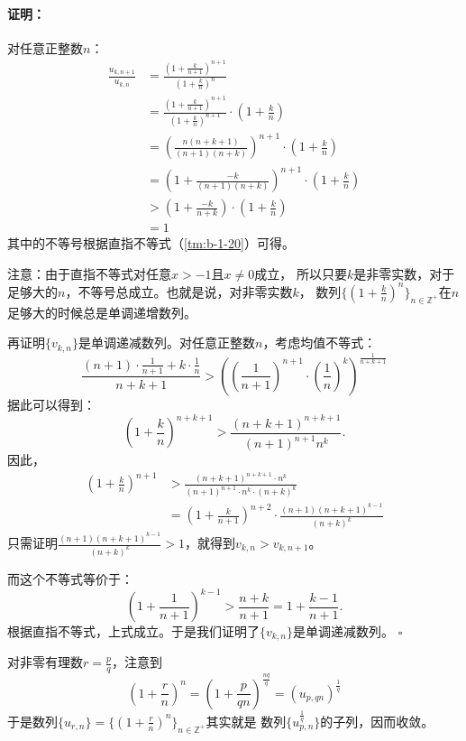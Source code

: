 \documentclass[12pt,UTF8]{ctexbook}
\renewenvironment{proof}{\paragraph{\textbf{证明：}}}{\hfill$\square$}
\begin{document}
\begin{appendix}
\begin{proof}
    对任意正整数$n$：
    \begin{align*}
        \frac{u_{k,n+1}}{u_{k,n}} &= \frac{\left(1 + \frac{k}{n+1}\right)^{n+1}}{\left(1 + \frac{k}{n}\right)^n}  \\
        &= \frac{\left(1 + \frac{k}{n+1}\right)^{n+1}}{\left(1 + \frac{k}{n}\right)^{n+1}} \cdot \left(1 + \frac{k}{n}\right)  \\
        &= \left(\frac{n(n+k+1)}{(n+1)(n+k)}\right)^{n+1} \cdot \left(1 + \frac{k}{n}\right)  \\
        &= \left(1 + \frac{-k}{(n+1)(n+k)}\right)^{n+1} \cdot \left(1 + \frac{k}{n}\right)  \\
        &> \left(1 + \frac{-k}{n+k}\right)\cdot \left(1 + \frac{k}{n}\right)  \\
        &= 1  
    \end{align*}
    其中的不等号根据直指不等式（\ref{tm:b-1-20}）可得。
    
    注意：由于直指不等式对任意$x>-1$且$x\neq 0$成立，
    所以只要$k$是非零实数，对于足够大的$n$，不等号总成立。也就是说，对非零实数$k$，
    数列$\{\left(1 + \frac{k}{n}\right)^n\}_{n\in\mathbb{Z}^+}$在$n$足够大的时候总是单调递增数列。

    再证明$\{v_{k,n}\}$是单调递减数列。对任意正整数$n$，考虑均值不等式：
    $$ \frac{(n+1)\cdot \frac{1}{n+1} + k\cdot \frac{1}{n}}{n+k+1} > \left(\left(\frac{1}{n+1}\right)^{n+1} \cdot \left(\frac{1}{n}\right)^{k}\right)^{\frac{1}{n+k+1}} $$
    据此可以得到：
    $$ \left(1 + \frac{k}{n}\right)^{n+k+1} > \frac{(n+k+1)^{n+k+1}}{(n+1)^{n+1} n^k}. $$
    因此，
    \begin{align*}
        \left(1 + \frac{k}{n}\right)^{n+1} &> \frac{(n+k+1)^{n+k+1}\cdot n^k}{(n+1)^{n+1}\cdot n^k\cdot (n+k)^k}  \\
        &= \left(1 + \frac{k}{n+1}\right)^{n+2} \cdot \frac{(n+1)(n+k+1)^{k-1}}{(n+k)^k} 
    \end{align*}
    只需证明$\frac{(n+1)(n+k+1)^{k-1}}{(n+k)^k} > 1$，就得到$v_{k,n} > v_{k,n+1}$。
    
    而这个不等式等价于：
    $$ \left(1 + \frac{1}{n+1}\right)^{k-1} > \frac{n+k}{n+1} = 1 + \frac{k-1}{n+1}.$$
    根据直指不等式，上式成立。于是我们证明了$\{v_{k,n}\}$是单调递减数列。
\end{proof}

对非零有理数$r = \frac{p}{q}$，注意到
$$ \left(1 + \frac{r}{n}\right)^n = \left(1 + \frac{p}{qn}\right)^{\frac{nq}{q}} = \left(u_{p,qn}\right)^\frac{1}{q}$$
于是数列$\{u_{r,n}\} = \{\left(1 + \frac{r}{n}\right)^n\}_{n\in\mathbb{Z}^+}$其实就是
数列$\{u_{p,n}^{\frac{1}{q}}\}$的子列，因而收敛。


\end{appendix}
\end{document}

